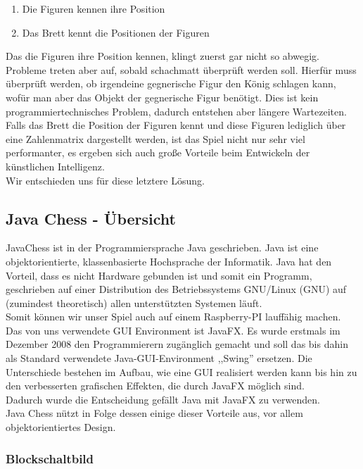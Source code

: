 \documentclass[12pt,a4paper]{article}
\begin{document}
\begin{enumerate}
	\item{Die Figuren kennen ihre Position}
	\item{Das Brett kennt die Positionen der Figuren}
\end{enumerate}
Das die Figuren ihre Position kennen, klingt zuerst gar nicht so abwegig. Probleme treten aber auf, sobald schachmatt überprüft werden soll. Hierfür muss überprüft werden, ob irgendeine gegnerische Figur den König schlagen kann, wofür man aber das Objekt der gegnerische Figur benötigt. Dies ist kein programmiertechnisches Problem, dadurch entstehen aber längere Wartezeiten. \\
Falls das Brett die Position der Figuren kennt und diese Figuren lediglich über eine Zahlenmatrix dargestellt werden, ist das Spiel nicht nur sehr viel performanter, es ergeben sich auch große Vorteile beim Entwickeln der künstlichen Intelligenz. \\ 
Wir entschieden uns für diese letztere Lösung.

\subsection{Java Chess - Übersicht}
\label{SUBSEC:JAVACHESS-OVERVIEW}

JavaChess ist in der Programmiersprache Java geschrieben. Java ist eine objektorientierte, klassenbasierte Hochsprache der Informatik. Java hat den Vorteil, dass es nicht Hardware gebunden ist und somit ein Programm, geschrieben auf einer Distribution des Betriebssystems GNU/Linux (\ac{GNU}) auf (zumindest theoretisch) allen unterstützten Systemen läuft. \\
Somit können wir unser Spiel auch auf einem Raspberry-PI lauffähig machen. \\
Das von uns verwendete \ac{GUI} Environment ist JavaFX. Es wurde erstmals im Dezember 2008 den Programmierern zugänglich gemacht und soll das bis dahin als Standard verwendete Java-GUI-Environment ,,Swing'' ersetzen. Die Unterschiede bestehen im Aufbau, wie eine GUI realisiert werden kann bis hin zu den verbesserten grafischen Effekten, die durch JavaFX möglich sind. \\[1ex]
Dadurch wurde die Entscheidung gefällt Java mit JavaFX zu verwenden.\\
Java Chess nützt in Folge dessen einige dieser Vorteile aus, vor allem objektorientiertes Design. 

\newpage
\subsubsection{Blockschaltbild}
\label{SUBSUBSEC:BLOCKSCHALTBILD}
\end{document}
